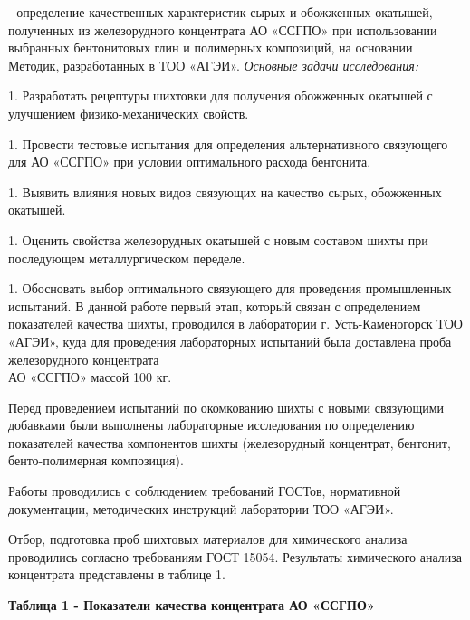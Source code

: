 - определение качественных характеристик сырых и обожженных окатышей,
полученных из железорудного концентрата АО «ССГПО» при использовании
выбранных бентонитовых глин и полимерных композиций, на основании
Методик, разработанных в ТОО «АГЭИ».
\emph{Основные задачи исследования:}


1. Разработать рецептуры шихтовки для получения обожженных окатышей с
улучшением физико-механических свойств.

1. Провести тестовые испытания для определения альтернативного связующего
для АО «ССГПО» при условии оптимального расхода бентонита.

1. Выявить влияния новых видов связующих на качество сырых, обожженных
окатышей.

1. Оценить свойства железорудных окатышей с новым составом шихты при
последующем металлургическом переделе.

1. Обосновать выбор оптимального связующего для проведения промышленных
испытаний.
В данной работе первый этап, который связан с определением показателей
качества шихты, проводился в лаборатории г. Усть-Каменогорск ТОО «АГЭИ»,
куда для проведения лабораторных испытаний была доставлена проба
железорудного концентрата\\
АО «ССГПО» массой 100 кг.

Перед проведением испытаний по окомкованию шихты с новыми связующими
добавками были выполнены лабораторные исследования по определению
показателей качества компонентов шихты (железорудный концентрат,
бентонит, бенто-полимерная композиция).

Работы проводились с соблюдением требований ГОСТов, нормативной
документации, методических инструкций лаборатории ТОО «АГЭИ».

Отбор, подготовка проб шихтовых материалов для химического анализа
проводились согласно требованиям ГОСТ 15054. Результаты химического
анализа концентрата представлены в таблице 1.

{\bfseries Таблица 1 - Показатели качества концентрата АО «ССГПО»}

